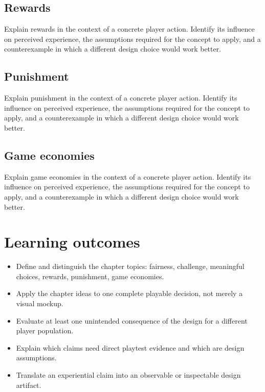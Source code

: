 \documentclass[11pt]{article}
\begin{document}
\subsection{Rewards}
Explain rewards in the context of a concrete player action. Identify its influence on perceived experience, the assumptions required for the concept to apply, and a counterexample in which a different design choice would work better.


\subsection{Punishment}
Explain punishment in the context of a concrete player action. Identify its influence on perceived experience, the assumptions required for the concept to apply, and a counterexample in which a different design choice would work better.


\subsection{Game economies}
Explain game economies in the context of a concrete player action. Identify its influence on perceived experience, the assumptions required for the concept to apply, and a counterexample in which a different design choice would work better.


\section{Learning outcomes}
\begin{itemize}
\item Define and distinguish the chapter topics: fairness, challenge, meaningful choices, rewards, punishment, game economies.
\item Apply the chapter ideas to one complete playable decision, not merely a visual mockup.
\item Evaluate at least one unintended consequence of the design for a different player population.
\item Explain which claims need direct playtest evidence and which are design assumptions.
\item Translate an experiential claim into an observable or inspectable design artifact.
\end{itemize}
\end{document}
